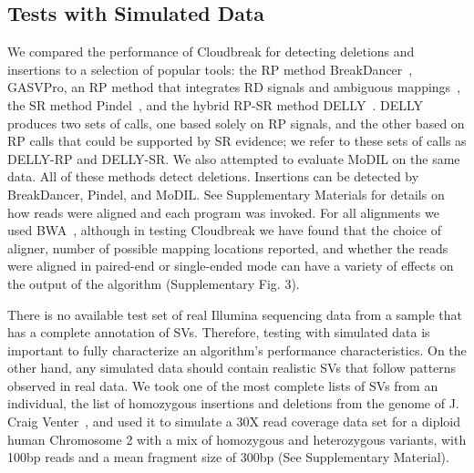 \documentclass{bioinfo}
\newcommand{\todo}[1]{}
\begin{document}
\subsection{Tests with Simulated Data}

We compared the performance of Cloudbreak for detecting deletions and insertions to a selection of popular tools: the RP method BreakDancer~\citep{Chen:2009p3}, GASVPro, an RP method that integrates RD signals and ambiguous mappings~\citep{Sindi:2012kk}, the SR method Pindel~\citep{Ye:2009p2}, and the hybrid RP-SR method DELLY~\citep{Rausch:2012he}. DELLY produces two sets of calls, one based solely on RP signals, and the other based on RP calls that could be supported by SR evidence; we refer to these sets of calls as DELLY-RP and DELLY-SR. We also attempted to evaluate MoDIL on the same data. All of these methods detect deletions. Insertions can be detected by BreakDancer, Pindel, and MoDIL. See Supplementary Materials for details on how reads were aligned and each program was invoked. For all alignments we used BWA~\citep{Li:2009p836}, although in testing Cloudbreak we have found that the choice of aligner, number of possible mapping locations reported, and whether the reads were aligned in paired-end or single-ended mode can have a variety of effects on the output of the algorithm (Supplementary Fig. 3\todo{\ref{Salignment_comparison}}).

There is no available test set of real Illumina sequencing data from a sample that has a complete annotation of SVs. Therefore, testing with simulated data is important to fully characterize an algorithm's performance characteristics. On the other hand, any simulated data should contain realistic SVs that follow patterns observed in real data. We took one of the most complete lists of SVs from an individual, the list of homozygous insertions and deletions from the genome of J. Craig Venter~\citep{Levy:2007fb}, and used it to simulate a 30X read coverage data set for a diploid human Chromosome 2 with a mix of homozygous and heterozygous variants, with 100bp reads and a mean fragment size of 300bp (See Supplementary Material).
\end{document}
